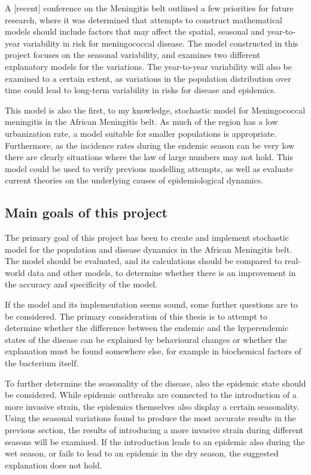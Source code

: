\documentclass[10pt,a4paper]{article}
\begin{document}
A [recent] conference on the Meningitis belt outlined a few priorities for future research, where it was determined that attempts to construct mathematical models should include factors that may affect the spatial, seasonal and year-to-year variability in risk for meningococcal disease. The model constructed in this project focuses on the seasonal variability, and examines two different explanatory models for the variations. The year-to-year variability will also be examined to a certain extent, as variations in the population distribution over time could lead to long-term variability in risks for disease and epidemics.

This model is also the first, to my knowledge, stochastic model for Meningococcal meningitis in the African Meningitis belt. As much of the region has a low urbanization rate, a model suitable for smaller populations is appropriate. Furthermore, as the incidence rates during the endemic season can be very low there are clearly situations where the law of large numbers may not hold. This model could be used to verify previous modelling attempts, as well as evaluate current theories on the underlying causes of epidemiological dynamics.

\subsection{Main goals of this project}

The primary goal of this project has been to create and implement stochastic model for the population and disease dynamics in the African Meningitis belt. The model should be evaluated, and its calculations should be compared to real-world data and other models, to determine whether there is an improvement in the accuracy and specificity of the model.

If the model and its implementation seems sound, some further questions are to be considered. The primary consideration of this thesis is to attempt to determine whether the difference between the endemic and the hyperendemic states of the disease can be explained by behavioural changes or whether the explanation must be found somewhere else, for example in biochemical factors of the bacterium itself.

To further determine the seasonality of the disease, also the epidemic state should be considered. While epidemic outbreaks are connected to the introduction of a more invasive strain, the epidemics themselves also display a certain seasonality. Using the seasonal variations found to produce the most accurate results in the previous section, the results of introducing a more invasive strain during different seasons will be examined. If the introduction leads to an epidemic also during the wet season, or fails to lead to an epidemic in the dry season, the suggested explanation does not hold.
\end{document}
